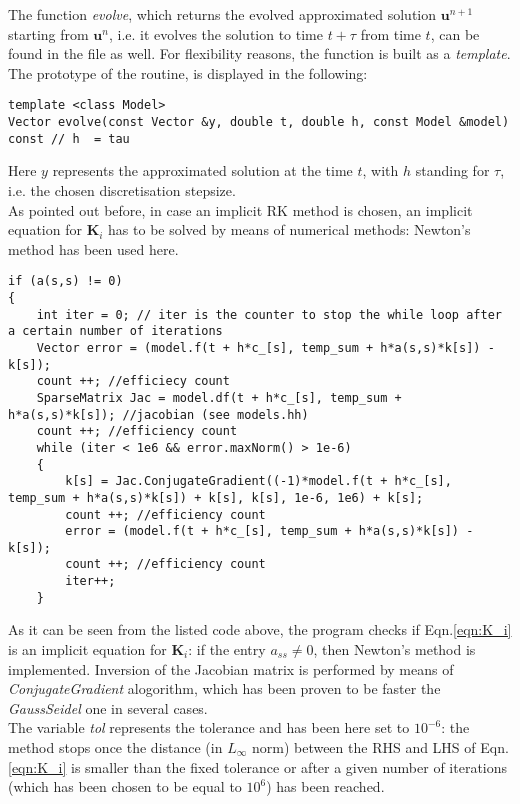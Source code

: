 \documentclass[11pt]{article}
\theoremstyle{theorem}
\theoremstyle{definition}
\begin{document}
The function \emph{evolve}, which returns the evolved approximated solution $\mathbf{u}^{n+1}$ starting from $\mathbf{u}^n$, i.e. it evolves the solution to time $t+\tau$ from time $t$, can be found in the file as well. For flexibility reasons, the function is built as a \emph{template}. The prototype of the routine, is displayed in the following:

\begin{lstlisting}
template <class Model>
Vector evolve(const Vector &y, double t, double h, const Model &model) const // h  = tau
\end{lstlisting}

Here $y$ represents the approximated solution at the time $t$, with $h$ standing for $\tau$, i.e. the chosen discretisation stepsize.\\
As pointed out before, in case an implicit RK method is chosen, an implicit equation for $\mathbf{K}_i$ has to be solved by means of numerical methods: Newton's method has been used here.\\

\begin{lstlisting}
if (a(s,s) != 0)
{
	int iter = 0; // iter is the counter to stop the while loop after a certain number of iterations
	Vector error = (model.f(t + h*c_[s], temp_sum + h*a(s,s)*k[s]) - k[s]);
	count ++; //efficiecy count
	SparseMatrix Jac = model.df(t + h*c_[s], temp_sum + h*a(s,s)*k[s]); //jacobian (see models.hh)
	count ++; //efficiency count
	while (iter < 1e6 && error.maxNorm() > 1e-6)
	{
		k[s] = Jac.ConjugateGradient((-1)*model.f(t + h*c_[s], temp_sum + h*a(s,s)*k[s]) + k[s], k[s], 1e-6, 1e6) + k[s];
		count ++; //efficiency count
		error = (model.f(t + h*c_[s], temp_sum + h*a(s,s)*k[s]) - k[s]);
		count ++; //efficiency count
		iter++;
	}
\end{lstlisting}

As it can be seen from the listed code above, the program checks if Eqn.\eqref{eqn:K_i} is an implicit equation for $\mathbf{K}_i$: if the entry $a_{ss}\neq 0$, then Newton's method is implemented. Inversion of the Jacobian matrix is performed by means of \emph{ConjugateGradient} alogorithm, which has been proven to be faster the \emph{GaussSeidel} one in several cases.\\
The variable \emph{tol} represents the tolerance and has been here set to $10^{-6}$: the method stops once the distance (in $L_\infty$ norm) between the RHS and LHS of Eqn.\eqref{eqn:K_i} is smaller than the fixed tolerance or after a given number of iterations (which has been chosen to be equal to $10^6$) has been reached.\\
\end{document}
